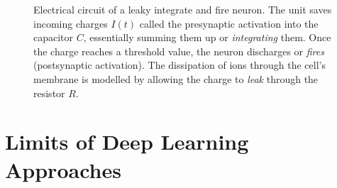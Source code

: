 \begin{figure}
    \centering
{}
\caption[Electrical circuit of a leaky integrate and fire neuron]{Electrical circuit of a leaky integrate and fire neuron. The unit saves incoming charges $I(t)$ called the presynaptic activation into the capacitor $C$, essentially summing them up or \emph{integrating} them. Once the charge reaches a threshold value, the neuron discharges or \emph{fires} (postsynaptic activation). The dissipation of ions through the cell's membrane is modelled by allowing the charge to \emph{leak} through the resistor $R$.}\label{fig:LIF}
\end{figure}\noindent
\section{Limits of Deep Learning Approaches}